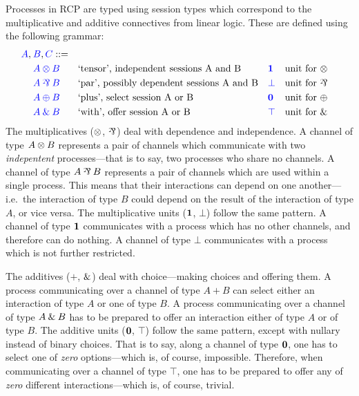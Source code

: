 \documentclass[a4paper,UKenglish]{lipics-v2016}
\begin{document}
Processes in RCP are typed using session types which correspond to the
multiplicative and additive connectives from linear logic. These are defined
using the following grammar:
\[
  \begin{aligned}
    \blue{A},\:&\blue{B},\blue{C} ::=\\
    & \tm{A \tens B} &&\text{`tensor', independent sessions A and B}
    &&\tm{\one}      &&\text{unit for \tens}\\
    & \tm{A \parr B} &&\text{`par', possibly dependent sessions A and B}
    &&\tm{\bot}      &&\text{unit for \parr}\\
    & \tm{A \plus B} &&\text{`plus', select session A or B}
    &&\tm{\nil}      &&\text{unit for \plus}\\
    & \tm{A \with B} &&\text{`with', offer session A or B}
    &&\tm{\top}      &&\text{unit for \with}
  \end{aligned}
\]
The multiplicatives ($\otimes$, $\parr$) deal with dependence and independence.
A channel of type $A \otimes B$ represents a pair of channels which communicate
with two \emph{indepentent} processes---that is to say, two processes who share
no channels.
A channel of type $A \parr B$ represents a pair of channels which are used
within a single process. This means that their interactions can depend on one
another---i.e.\ the interaction of type $B$ could depend on the result of the
interaction of type $A$, or vice versa.
The multiplicative units ($\mathbf{1}$, $\bot$) follow the same pattern.
A channel of type $\mathbf{1}$ communicates with a process which has no other
channels, and therefore can do nothing.
A channel of type $\bot$ communicates with a process which is not further
restricted.

The additives ($\plus$, $\mathbin{\text{\&}}$) deal with choice---making choices and offering
them.
A process communicating over a channel of type $A \plus B$ can select either an
interaction of type $A$ or one of type $B$. 
A process communicating over a channel of type $A \mathbin{\text{\&}} B$ has to be prepared to
offer an interaction either of type $A$ or of type $B$. 
The additive units ($\mathbf{0}$, $\top$) follow the same pattern, except with nullary
instead of binary choices. That is to say, along a channel of type $\mathbf{0}$, one
has to select one of \emph{zero} options---which is, of course, impossible.
Therefore, when communicating over a channel of type $\top$, one has to be
prepared to offer any of \emph{zero} different interactions---which is, of
course, trivial.
\end{document}
